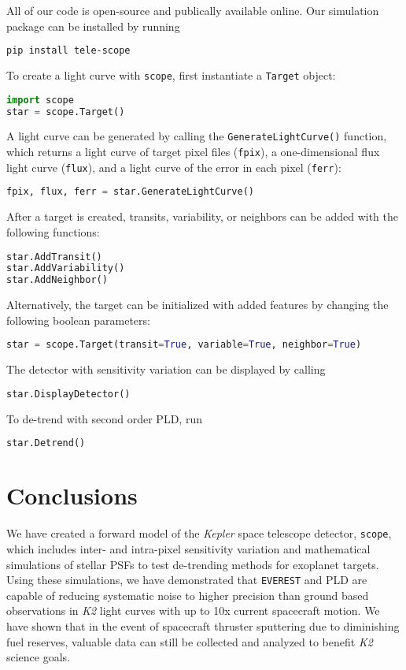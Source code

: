 \documentclass[12pt,preprint]{aastex}
\begin{document}
All of our code is open-source and publically available online. Our simulation package can be installed by running
%
\begin{lstlisting}[language=bash]
pip install tele-scope
\end{lstlisting}
%
To create a light curve with \texttt{scope}, first instantiate a \texttt{Target} object:
%
\begin{lstlisting}[language=Python]
import scope
star = scope.Target()
\end{lstlisting}
%
A light curve can be generated by calling the \texttt{GenerateLightCurve()} function, which returns a light curve of target pixel files (\texttt{fpix}), a one-dimensional flux light curve (\texttt{flux}), and a light curve of the error in each pixel (\texttt{ferr}):
%
\begin{lstlisting}[language=Python]
fpix, flux, ferr = star.GenerateLightCurve()
\end{lstlisting}
%
After a target is created, transits, variability, or neighbors can be added with the following functions:
%
\begin{lstlisting}[language=Python]
star.AddTransit()
star.AddVariability()
star.AddNeighbor()
\end{lstlisting}
Alternatively, the target can be initialized with added features by changing the following boolean parameters:
%
\begin{lstlisting}[language=Python]
star = scope.Target(transit=True, variable=True, neighbor=True)
\end{lstlisting}
%
The detector with sensitivity variation can be displayed by calling
%
\begin{lstlisting}[language=Python]
star.DisplayDetector()
\end{lstlisting}
%
To de-trend with second order PLD, run
\begin{lstlisting}[language=Python]
star.Detrend()
\end{lstlisting}
\section{Conclusions}

We have created a forward model of the \textit{Kepler} space telescope detector, \texttt{scope}, which includes inter- and intra-pixel sensitivity variation and mathematical simulations of stellar PSFs to test de-trending methods for exoplanet targets. Using these simulations, we have demonstrated that \texttt{EVEREST} and PLD are  capable of reducing systematic noise to higher precision than ground based observations in \textit{K2} light curves with up to 10x current spacecraft motion. We have shown that in the event of spacecraft thruster sputtering due to diminishing fuel reserves, valuable data can still be collected and analyzed to benefit \textit{K2} science goals.
\end{document}
